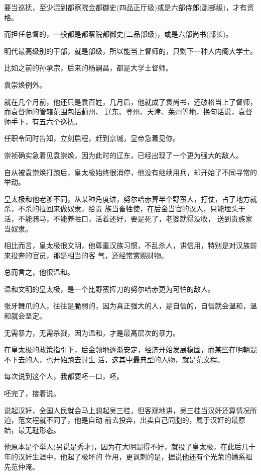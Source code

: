 \documentclass[11pt,a4paper,onecolumn]{article}
\begin{document}
要当巡抚，至少混到都察院佥都御史(四品正厅级)或是六部侍郎(副部级)，才有资格。

而担任总督的，一般都是都察院都御史(二品部级)，或是六部尚书(部长)。

明代最高级别的干部，就是部级，所以能当上督师的，只剩下一种人\myrule 内阁大学士。

比如之前的孙承宗，后来的杨嗣昌，都是大学士督师。

袁崇焕例外。

就在几个月前，他还只是袁百姓，几月后，他就成了袁尚书，还破格当上了督师，而袁督师的管辖范围包括蓟州、
辽东、登州、天津、莱州等地，换句话说，袁督师手下，有五六个巡抚。

任职令同时告知，立刻启程，赶到京城，皇帝急着见你。

崇祯确实急着见袁崇焕，因为此时的辽东，已经出现了一个更为强大的敌人。

自从被袁崇焕打跑后，皇太极始终很消停，他没有继续用兵，却开始了不同寻常的举动。

皇太极和他老爹不同，从某种角度讲，努尔哈赤算半个野蛮人，打仗，占了地方就杀，不杀的拉回来做奴隶，给贵
族当畜牲使，在后金当官的汉人，只能埋头干活，不能骑马，不能养牲口，活着还好，要是死了，老婆就得没收，
送到贵族家当奴隶。

相比而言，皇太极很文明，他尊重汉族习惯，不乱杀人，讲信用，特别是对汉族前来投奔的官员，那是相当的客
气，还经常赏赐财物。

总而言之，他很温和。

温和文明的皇太极，是一个比野蛮挥刀的努尔哈赤更为可怕的敌人。

张牙舞爪的人，往往是脆弱的，因为真正强大的人，是自信的，自信就会温和，温和就会坚定。

无需暴力，无需杀戮，因为温和，才是最高层次的暴力。

在皇太极的政策指引下，后金领地逐渐安定，经济开始发展稳固，而某些在明朝混不下去的人，也开始跑去讨生
活，这其中最典型的人物，就是范文程。

每次说到这个人，我都要呸一口，呸。

呸完了，接着说。

说起汉奸，全国人民就会马上想起吴三桂，但客观地讲，吴三桂当汉奸还算情况所迫，范文程就不同了，他是自动
前去投奔，出卖自己同胞的，属于汉奸的最原始，最无耻形态。

他原本是个举人(另说是秀才)，因为在大明混得不好，就投了皇太极，在此后几十年的汉奸生涯中，他起了极坏的
作用，更讽刺的是，据说他还有个光荣的嫡系祖先\myrule 范仲淹。

\section[\thesection]{}
\end{document}
